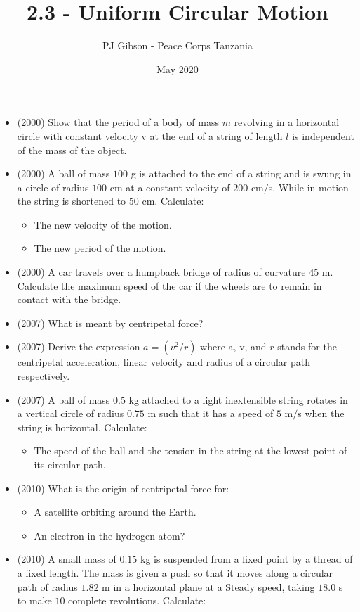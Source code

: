 \documentclass{article}
\title{\textbf{2.3 - Uniform Circular Motion}}
\author{PJ Gibson - Peace Corps Tanzania}
\date{May 2020}
\begin{document}
\maketitle

\begin{itemize}
\item (2000)  Show that the period of a body of mass $ m$ revolving in a horizontal circle with constant velocity v at the end of a string of length $ l$ is independent of the mass of the object.
\item (2000)  A ball of mass $ 100$ g is attached to the end of a string and is swung in a circle of radius $ 100$ cm at a constant velocity of $ 200$ cm$/$s. While in motion the string is shortened to $ 50$ cm. Calculate:
 \begin{itemize}
\item The new velocity of the motion.
\item The new period of the motion.
\end{itemize}
\item (2000)  A car travels over a humpback bridge of radius of curvature $ 45$ m. Calculate the maximum speed of the car if the wheels are to remain in contact with the bridge.
\item (2007)  What is meant by centripetal force?
\item (2007)  Derive the expression $ a =(v^{2}/r)$ where a, v, and $ r$ stands for the centripetal acceleration, linear velocity and radius of a circular path respectively.  
\item (2007)  A ball of mass $ 0.5$ kg attached to a light inextensible string rotates in a vertical circle of radius $ 0.75$ m such that it has a speed of $ 5$ m$/$s when the string is horizontal.  Calculate:
 \begin{itemize}
\item  The speed of the ball and the tension in the string at the lowest point of its circular path.
\end{itemize}
\item (2010)  What is the origin of centripetal force for:
 \begin{itemize}
\item A satellite orbiting around the Earth. 
\item An electron in the hydrogen atom?
\end{itemize}
\item (2010)  A small mass of $ 0.15$ kg is suspended from a fixed point by a thread of a fixed length. The mass is given a push so that it moves along a circular path of radius $ 1.82$ m in a horizontal plane at a Steady speed, taking $ 18.0$ s to make $ 10$ complete revolutions. Calculate:

\end{itemize}
\end{document}
